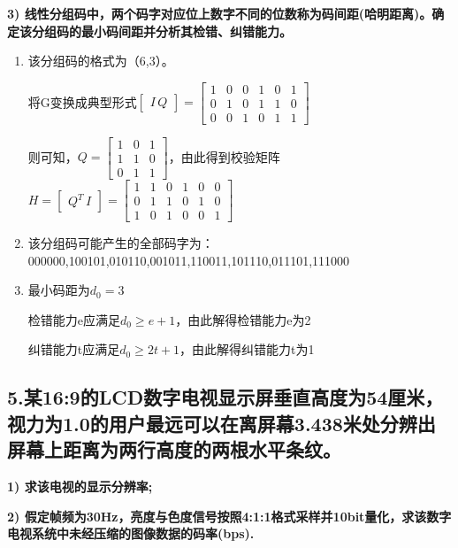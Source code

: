 \documentclass[]{article}
\begin{document}
\textbf{3) 线性分组码中，两个码字对应位上数字不同的位数称为码间距(哈明距离)。确定该分组码的最小码间距并分析其检错、纠错能力。}

\begin{enumerate}[(1)]
    \item 
        该分组码的格式为（6,3）。
        
        将G变换成典型形式$\begin{bmatrix}I\,Q \end{bmatrix}=\begin{bmatrix}1 & 0 & 0 & 1 & 0 & 1 \\ 0 & 1 & 0 & 1 & 1 & 0 \\ 0 & 0 & 1 & 0 & 1 & 1\end{bmatrix}$
        
        则可知，$Q=\begin{bmatrix}1 & 0 & 1 \\ 1 & 1 & 0 \\ 0 & 1 & 1 \end{bmatrix}$，由此得到校验矩阵$H=\begin{bmatrix}Q^T\,I \end{bmatrix}=\begin{bmatrix}1 & 1 & 0 & 1 & 0 & 0 \\ 0 & 1 & 1 & 0 & 1 & 0\\ 1 & 0 & 1 & 0 & 0 & 1 \end{bmatrix}$
        
    \item
        该分组码可能产生的全部码字为：000000,100101,010110,001011,110011,101110,011101,111000
        
    \item
        最小码距为$d_0=3$
        
        检错能力e应满足$d_0\geq e+1$，由此解得检错能力e为2
        
        纠错能力t应满足$d_0\geq 2t+1$，由此解得纠错能力t为1
\end{enumerate}

\hypertarget{header-n104}{%
\subsection{5.某16:9的LCD数字电视显示屏垂直高度为54厘米，视力为1.0的用户最远可以在离屏幕3.438米处分辨出屏幕上距离为两行高度的两根水平条纹。
}\label{header-n104}}
\textbf{1) 求该电视的显示分辨率;}

\textbf{2) 假定帧频为30Hz，亮度与色度信号按照4:1:1格式采样并10bit量化，求该数字电视系统中未经压缩的图像数据的码率(bps).}
\end{document}
